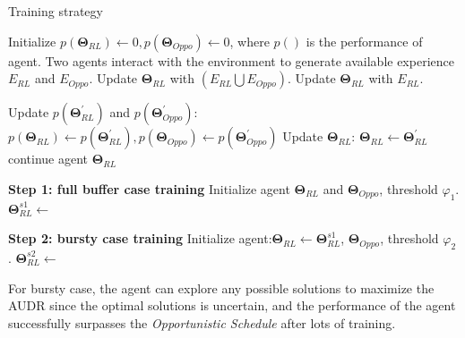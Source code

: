 \documentclass[conference,compsocconf]{IEEEtran}
\begin{document}
\begin{algorithm}
    \caption{Training strategy}
    \begin{algorithmic}[1]
		\State Initialize $p(\mathbf{\Theta}_{RL}) \leftarrow 0, p(\mathbf{\Theta}_{Oppo}) \leftarrow 0$, where $ p() $ is the performance of agent.
        \State Two agents interact with the environment to generate available experience $ E_{RL}$ and $E_{Oppo}$.
        \State Update $ \mathbf{\Theta}_{RL} $ with $ (E_{RL} \bigcup E_{Oppo})$.
        \Else
        \State Update $ \mathbf{\Theta}_{RL} $ with $ E_{RL}$.
        \EndIf
        
        \State Update $p(\mathbf{\Theta}^{\prime}_{RL})$ and $p(\mathbf{\Theta}^{\prime}_{Oppo})$:
        $
        p(\mathbf{\Theta}_{RL}) \leftarrow p(\mathbf{\Theta}^{\prime}_{RL}), p(\mathbf{\Theta}_{Oppo}) \leftarrow p(\mathbf{\Theta}^{\prime}_{Oppo})
        $
        \EndFor
        \State Update $\mathbf{\Theta}_{RL}$: $ \mathbf{\Theta}_{RL} \leftarrow \mathbf{\Theta}^{\prime}_{RL} $
        \Else
        \State continue
		\EndIf
		\EndWhile
		\Return agent $\mathbf{\Theta}_{RL}$
        \EndFunction

        \State \textbf{Step 1: full buffer case training}
        \State
		Initialize agent $\mathbf{\Theta}_{RL}$ and $\mathbf{\Theta}_{Oppo}$, threshold $ \varphi_{1} $.
		\State $ \mathbf{\Theta}^{s1}_{RL} \leftarrow $
        
        \State \textbf{Step 2: bursty case training}
		\State Initialize agent:$\mathbf{\Theta}_{RL} \leftarrow \mathbf{\Theta}^{s1}_{RL}$, $\mathbf{\Theta}_{Oppo}$, threshold $ \varphi_{2} $.
		\State $ \mathbf{\Theta}^{s2}_{RL} \leftarrow $
    
    \end{algorithmic}
\end{algorithm}


For bursty case, the agent can explore any possible solutions to maximize the AUDR since the optimal solutions is uncertain, and the performance of the agent successfully surpasses the \textit{Opportunistic Schedule} after lots of training.
\end{document}
